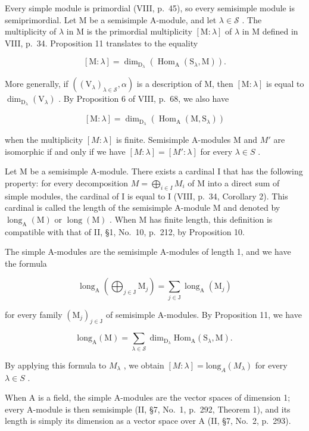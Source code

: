 Every simple module is primordial (VIII, p.~45), so every semisimple module is semiprimordial. Let M be a semisimple A-module, and let \(\lambda \in \mathcal{S}\) . The multiplicity of \(\lambda\) in M is the primordial multiplicity \([\mathrm{M}:\lambda]\) of \(\lambda\) in M defined in VIII, p.~34. Proposition 11 translates to the equality

\[
[ \mathrm{M}: \lambda ] = \dim_ {\mathrm{D} _ {\lambda}} (\operatorname{Hom} _ {\mathrm{A}} (\mathrm{S} _ {\lambda}, \mathrm{M})).\tag{11}
\]

More generally, if \(((\mathrm{V}_{\lambda})_{\lambda \in \mathcal{S}},\alpha)\) is a description of M, then \([\mathrm{M}:\lambda ]\) is equal to \(\dim_{\mathrm{D}_{\lambda}}(\mathrm{V}_{\lambda})\) . By Proposition 6 of VIII, p.~68, we also have

\[
[ \mathrm{M}: \lambda ] = \dim_ {\mathrm{D} _ {\lambda}} (\operatorname{Hom} _ {\mathrm{A}} (\mathrm{M}, \mathrm{S} _ {\lambda}))\tag{12}
\]

when the multiplicity \([M : \lambda]\) is finite. Semisimple A-modules M and \(M'\) are isomorphic if and only if we have \([M : \lambda] = [M' : \lambda]\) for every \(\lambda \in S\) .

Let M be a semisimple A-module. There exists a cardinal I that has the following property: for every decomposition \(M = \bigoplus_{i \in I} M_i\) of M into a direct sum of simple modules, the cardinal of I is equal to I (VIII, p.~34, Corollary 2). This cardinal is called the length of the semisimple A-module M and denoted by \(\operatorname{long}_{\mathrm{A}}(\mathrm{M})\) or \(\operatorname{long}(\mathrm{M})\) . When M has finite length, this definition is compatible with that of II, §1, No.~10, p.~212, by Proposition 10.

The simple A-modules are the semisimple A-modules of length 1, and we have the formula

\[
\operatorname{long} _ {\mathrm{A}} \left(\bigoplus_ {j \in \mathrm{J}} \mathrm{M} _ {j}\right) = \sum_ {j \in \mathrm{J}} \operatorname{long} _ {\mathrm{A}} (\mathrm{M} _ {j})\tag{13}
\]

for every family \((\mathrm{M}_j)_{j\in \mathrm{J}}\) of semisimple A-modules. By Proposition 11, we have

\[
\mathrm{long} _ {\mathrm{A}} (\mathrm{M}) = \sum_ {\lambda \in \mathcal {S}} \dim_ {\mathrm{D} _ {\lambda}} \mathrm{Hom} _ {\mathrm{A}} (\mathrm{S} _ {\lambda}, \mathrm{M}).\tag{14}
\]

By applying this formula to \(M_{\lambda}\) , we obtain \([M : \lambda] = \text{long}_{A}(M_{\lambda})\) for every \(\lambda \in S\) .

When A is a field, the simple A-modules are the vector spaces of dimension 1; every A-module is then semisimple (II, §7, No.~1, p.~292, Theorem 1), and its length is simply its dimension as a vector space over A (II, §7, No.~2, p.~293).

